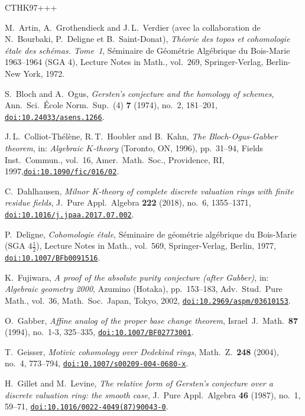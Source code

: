 \documentclass[10pt,a4paper]{article}
\providecommand{\doi}[2][]{\href{https://doi.org/#2}{\nolinkurl{doi:#2}}}
\numberwithin{equation}{section}
\newtheorem{Key lemma}[theorem]{Key lemma}
\theoremstyle{definition}
\theoremstyle{remark}
\begin{document}
\begin{thebibliography}{CTHK97+++}

M.~Artin, A.~Grothendieck and J.\,L.~Verdier (avec la collaboration de N.~Bourbaki, P.~Deligne et B.~Saint-Donat), \emph{Th\'{e}orie des topos et cohomologie \'{e}tale des sch\'{e}mas. Tome~1}, S\'{e}minaire de G\'{e}om\'{e}trie Alg\'{e}brique du Bois-Marie 1963--1964 (SGA 4), Lecture Notes in Math., vol.~269, Springer-Verlag, Berlin-New York, 1972.

S.~Bloch and A.~Ogus, \emph{Gersten's conjecture and the homology of schemes},
Ann.\ Sci.\ \'Ecole Norm.\ Sup.\ (4) \textbf{7} (1974), no.~2, 181--201,
\doi{10.24033/asens.1266}.

J.\,L.~Colliot-Th\'el\`ene, R.\,T.~Hoobler and B.~Kahn, \emph{The
  {B}loch-{O}gus-{G}abber theorem}, in: \emph{Algebraic {$K$}-theory} ({T}oronto, {ON}, 1996),  pp.~31--94, Fields Inst.\ Commun., vol.~16, Amer.\ Math.\ Soc., Providence, RI, 1997,\doi{10.1090/fic/016/02}.

C.~Dahlhausen, \emph{Milnor {K}-theory of complete discrete valuation rings
  with finite residue fields}, J.\ Pure Appl.\ Algebra \textbf{222} (2018),
  no.~6, 1355--1371, \doi{10.1016/j.jpaa.2017.07.002}.

P.~Deligne, \emph{Cohomologie \'{e}tale}, S\'{e}minaire de g\'{e}om\'{e}trie
  alg\'{e}brique du Bois-Marie (SGA $4\frac{1}{2}$), Lecture Notes in Math., vol.~569, Springer-Verlag, Berlin, 1977, \doi{10.1007/BFb0091516}.
  
K.~Fujiwara, \emph{A proof of the absolute purity conjecture (after {G}abber)},
 in: \emph{Algebraic geometry 2000}, {A}zumino ({H}otaka), pp.~153--183, Adv.\ Stud.\ Pure Math.,  vol.~36, Math.\ Soc.\ Japan, Tokyo, 2002, \doi{10.2969/aspm/03610153}.
 
O.~Gabber, \emph{Affine analog of the proper base change theorem}, Israel~J.\
  Math.\ \textbf{87} (1994), no.~1-3, 325--335,
  \doi{10.1007/BF02773001}.

T.~Geisser, \emph{Motivic cohomology over {D}edekind rings}, Math.~Z.\
  \textbf{248} (2004), no.~4, 773--794, \doi{10.1007/s00209-004-0680-x}.

\bibitem[GL87]{GL87}
H.~Gillet and M.~Levine, \emph{The relative form of {G}ersten's conjecture over
  a discrete valuation ring: the smooth case}, J.~Pure Appl.\ Algebra
  \textbf{46} (1987), no.~1, 59--71, \doi{10.1016/0022-4049(87)90043-0}.


\end{thebibliography}
\end{document}

